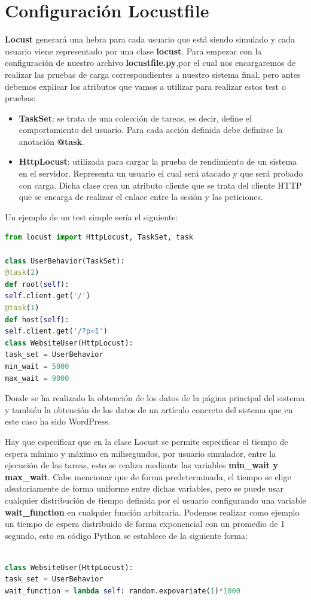 \section{Configuración Locustfile}
\textbf{Locust} generará una hebra para cada usuario que está siendo simulado y cada usuario viene representado por una clase \textbf{locust}.
Para empezar con la configuración de nuestro archivo \textbf{locustfile.py},por el cual nos encargaremos de realizar las pruebas de carga correspondientes a nuestro sistema final, pero antes debemos explicar los atributos que vamos a utilizar para realizar estos test o pruebas:

\begin{itemize}
	\item \textbf{TaskSet}: se trata de una colección de tareas, es decir, define el comportamiento del usuario. Para cada acción definida debe definirse la anotación \textbf{@task}.
	\item \textbf{HttpLocust}: utilizada para cargar la prueba de rendimiento de un sistema en el servidor. Representa un usuario el cual será atacado y que será probado con carga. Dicha clase crea un atributo cliente que se trata del cliente HTTP que se encarga de realizar el enlace entre la sesión y las peticiones.
\end{itemize}

Un ejemplo de un test simple sería el siguiente:
\begin{lstlisting}[language=Python]
from locust import HttpLocust, TaskSet, task

class UserBehavior(TaskSet):
@task(2)
def root(self):
self.client.get('/')
@task(1)
def host(self):
self.client.get('/?p=1')
class WebsiteUser(HttpLocust):
task_set = UserBehavior
min_wait = 5000
max_wait = 9000

\end{lstlisting}

Donde se ha realizado la obtención de los datos de la página principal del sistema y también la obtención de los datos de un artículo concreto del sistema que en este caso ha sido WordPress.

Hay que especificar que en la clase Locust se permite especificar el tiempo de espera mínimo y máximo en milisegundos, por usuario simulador, entre la ejecución de las tareas, esto se realiza mediante las variables \textbf{min\_wait y max\_wait}.
\newpage
Cabe mencionar que de forma predeterminada, el tiempo se elige aleatoriamente  de forma uniforme entre dichas variables, pero se puede usar cualquier distribución de tiempo definida por el usuario configurando una variable \textbf{wait\_function} en cualquier función arbitraria. Podemos realizar como ejemplo un tiempo de espera distribuido de forma exponencial con un promedio de 1 segundo, esto en código Python se establece de la siguiente forma:
\begin{lstlisting}[language=Python]

class WebsiteUser(HttpLocust):
task_set = UserBehavior
wait_function = lambda self: random.expovariate(1)*1000

\end{lstlisting}

